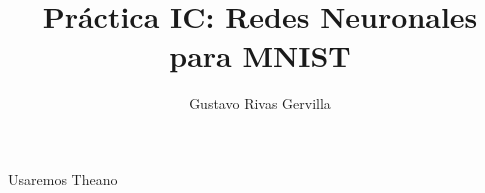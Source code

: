 \documentclass[10pt,a4paper]{article}
\author{Gustavo Rivas Gervilla}
\title{Práctica IC: Redes Neuronales para MNIST}
\begin{document}
Usaremos Theano
\end{document}
